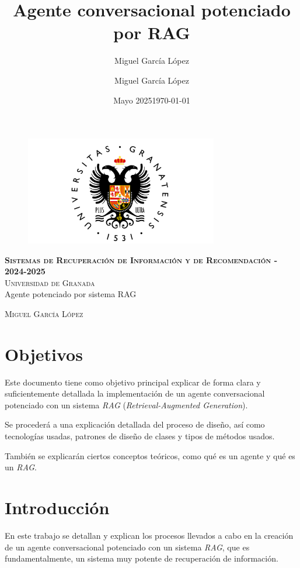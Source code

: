 \documentclass[12pt,letterpaper]{article}
\title{Agente conversacional potenciado por RAG}
\author{Miguel García López}
\date{Mayo 2025}
\author{Miguel García López} %
\date{\normalsize\today} %
\begin{document}
\begin{titlepage}
    \begin{figure}
        \vspace{-1.3cm}
        \begin{center}
            \includegraphics[width=0.75\textwidth]{img/UGR-Logo.png}
        \end{center}
    \end{figure}
    \vspace{1.3cm}
    \centering
    \normalfont \normalsize
    \textsc{\textbf{Sistemas de Recuperación de Información y de Recomendación - 2024-2025} \\\vspace{.15cm} Universidad de Granada} \\ [25pt]
    \huge Agente potenciado por sistema RAG

    \normalfont \normalsize \vspace{.30cm}
    \textsc{Miguel García López}

\end{titlepage}

\tableofcontents
\listoffigures
\listoftables
\newpage

\section{Objetivos}
Este documento tiene como objetivo principal explicar de forma clara y suficientemente detallada la implementación de un agente conversacional potenciado con un sistema \textit{RAG} (\textit{Retrieval-Augmented Generation}).

Se procederá a una explicación detallada del proceso de diseño, así como tecnologías usadas, patrones de diseño de clases y tipos de métodos usados.

También se explicarán ciertos conceptos teóricos, como qué es un agente y qué es un \textit{RAG}.

\section{Introducción}
En este trabajo se detallan y explican los procesos llevados a cabo en la creación de un agente conversacional potenciado con un sistema \textit{RAG}, que es fundamentalmente, un sistema muy potente de recuperación de información.
\end{document}
